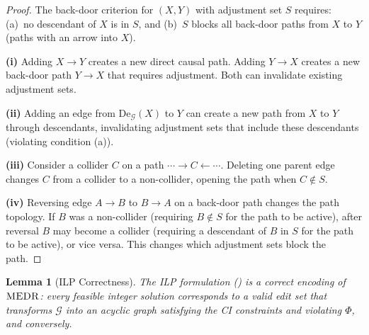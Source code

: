 \documentclass[11pt,a4paper]{article}
\newtheorem{lemma}[theorem]{Lemma}
\theoremstyle{definition}
\theoremstyle{remark}
\newcommand{\DAG}{\mathcal{G}}
\newcommand{\De}{\mathrm{De}}
\newcommand{\MEDR}{\textsc{MEDR}}
\newcommand{\Phi}{\varPhi}
\begin{document}
\begin{proof}
The back-door criterion for $(X, Y)$ with adjustment set $S$ requires: (a)~no
descendant of $X$ is in $S$, and (b)~$S$ blocks all back-door paths from $X$ to $Y$
(paths with an arrow into $X$).

\textbf{(i)} Adding $X \to Y$ creates a new direct causal path. Adding $Y \to X$
creates a new back-door path $Y \to X$ that requires adjustment. Both can invalidate
existing adjustment sets.

\textbf{(ii)} Adding an edge from $\De_\DAG(X)$ to $Y$ can create a new path from $X$
to $Y$ through descendants, invalidating adjustment sets that include these descendants
(violating condition (a)).

\textbf{(iii)} Consider a collider $C$ on a path $\cdots \to C \leftarrow \cdots$.
Deleting one parent edge changes $C$ from a collider to a non-collider, opening the
path when $C \notin S$.

\textbf{(iv)} Reversing edge $A \to B$ to $B \to A$ on a back-door path changes the
path topology. If $B$ was a non-collider (requiring $B \notin S$ for the path to be
active), after reversal $B$ may become a collider (requiring a descendant of $B$ in $S$
for the path to be active), or vice versa. This changes which adjustment sets block the
path.
\end{proof}

\begin{lemma}[ILP Correctness]\label{lem:ilp_correct}
The ILP formulation () is a correct encoding of $\MEDR$: every feasible
integer solution corresponds to a valid edit set that transforms $\DAG$ into an acyclic
graph satisfying the CI constraints and violating $\Phi$, and conversely.
\end{lemma}
\end{document}
